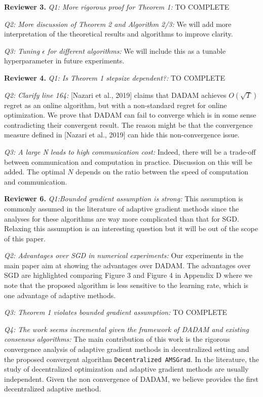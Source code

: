 \documentclass{article}
\begin{document}
\textbf{Reviewer 3.}
\textit{Q1: More rigorous proof for Theorem 1:}
{\color{red} TO COMPLETE}

\textit{Q2: More discussion of Theorem 2 and Algorithm 2/3:}
We will add more interpretation of the theoretical results and algorithms to improve clarity. 

\textit{Q3: Tuning $\epsilon$ for different algorithms:}
We will include this as a tunable hyperparameter in future experiments. 

\textbf{Reviewer 4.}
\textit{Q1: Is Theorem 1 stepsize dependent?:}
{\color{red} TO COMPLETE}

\textit{Q2:  Clarify line 164:}
 [Nazari et al., 2019] claims that DADAM achieves $O(\sqrt{T})$ regret as an online algorithm, but with a non-standard regret for online optimization. 
 We prove that DADAM can fail to converge which is in some sense contradicting their convergent result. The reason might be that the convergence measure defined in [Nazari et al., 2019] can hide this non-convergence issue.

\textit{Q3: A large N leads to high communication cost:}
Indeed, there will be a trade-off between communication and computation in practice.
Discussion on this will be added.
The optimal $N$ depends on the ratio between the speed of computation and communication.   

\textbf{Reviewer 6.}
\textit{Q1:Bounded gradient assumption is strong:}
This assumption is commonly assumed in the literature of adaptive gradient methods since the analyses for these algorithms are way more complicated than that for SGD. 
Relaxing this assumption is an interesting question but it will be out of the scope of this paper.

\textit{Q2: Advantages over SGD in numerical experiments:}
Our experiments in the main paper aim at showing the advantages over DADAM. 
The advantages over SGD are highlighted comparing Figure 3 and Figure 4 in Appendix D where we note that the proposed algorithm is less sensitive to the learning rate, which is one advantage of adaptive methods.

\textit{Q3: Theorem 1 violates bounded gradient assumption:}
{\color{red} TO COMPLETE}

\textit{Q4: The work seems incremental given the framework of DADAM and existing consensus algorithms:}
The main contribution of this work is the rigorous convergence analysis of adaptive gradient methods in decentralized setting and the proposed convergent algorithm \texttt{Decentralized AMSGrad}. 
In the literature, the study of decentralized optimization and adaptive gradient methods are usually independent. 
Given the non convergence of DADAM, we believe provides the first decentralized adaptive method.
\end{document}
